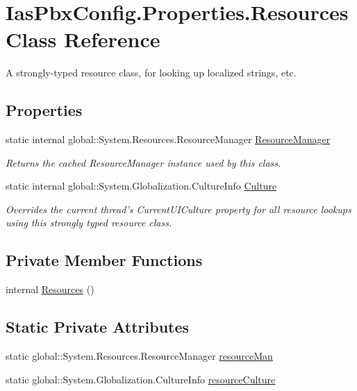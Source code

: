 \hypertarget{class_ias_pbx_config_1_1_properties_1_1_resources}{
\section{IasPbxConfig.Properties.Resources Class Reference}
\label{class_ias_pbx_config_1_1_properties_1_1_resources}
}


A strongly-\/typed resource class, for looking up localized strings, etc.  
\subsection*{Properties}
\begin{DoxyCompactItemize}
\item 
static internal global::System.Resources.ResourceManager \hyperlink{class_ias_pbx_config_1_1_properties_1_1_resources_a227e9f96e2941625af56707a2ee7e84d}{ResourceManager}
\begin{DoxyCompactList}\small\item\em Returns the cached ResourceManager instance used by this class. \item\end{DoxyCompactList}\item 
static internal global::System.Globalization.CultureInfo \hyperlink{class_ias_pbx_config_1_1_properties_1_1_resources_ac86b17b0b60450ffd58d31386fc4fa3b}{Culture}
\begin{DoxyCompactList}\small\item\em Overrides the current thread's CurrentUICulture property for all resource lookups using this strongly typed resource class. \item\end{DoxyCompactList}\end{DoxyCompactItemize}
\subsection*{Private Member Functions}
\begin{DoxyCompactItemize}
\item 
internal \hyperlink{class_ias_pbx_config_1_1_properties_1_1_resources_a23dc0b71205a7f55c05f4d132901c90d}{Resources} ()
\end{DoxyCompactItemize}
\subsection*{Static Private Attributes}
\begin{DoxyCompactItemize}
\item 
static global::System.Resources.ResourceManager \hyperlink{class_ias_pbx_config_1_1_properties_1_1_resources_a250bf1e5d02bc97bafed037698f69671}{resourceMan}
\item 
static global::System.Globalization.CultureInfo \hyperlink{class_ias_pbx_config_1_1_properties_1_1_resources_a21ad6bf1177474cf320daf62f6cc6ade}{resourceCulture}
\end{DoxyCompactItemize}



